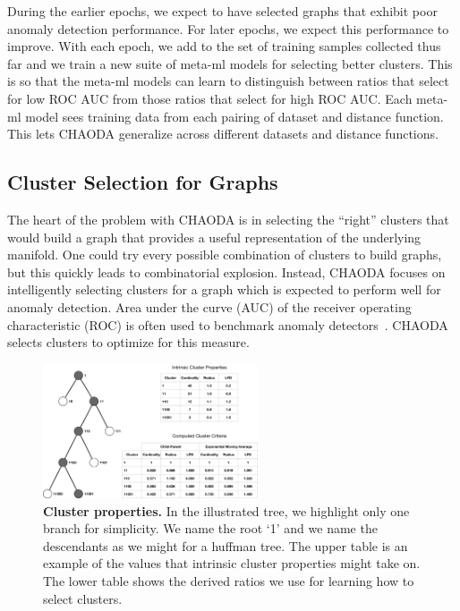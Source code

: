 During the earlier epochs, we expect to have selected graphs that exhibit poor anomaly detection performance.
For later epochs, we expect this performance to improve.
With each epoch, we add to the set of training samples collected thus far and we train a new suite of meta-ml models for selecting better clusters.
This is so that the meta-ml models can learn to distinguish between ratios that select for low ROC AUC from those ratios that select for high ROC AUC.
Each meta-ml model sees training data from each pairing of dataset and distance function.
This lets CHAODA generalize across different datasets and distance functions.


\subsection{Cluster Selection for Graphs}
\label{subsec:methods:cluster-selection-for-graphs}

The heart of the problem with CHAODA is in selecting the ``right'' clusters that would build a graph that provides a useful representation of the underlying manifold.
One could try every possible combination of clusters to build graphs, but this quickly leads to combinatorial explosion.
Instead, CHAODA focuses on intelligently selecting clusters for a graph which is expected to perform well for anomaly detection.
Area under the curve (AUC) of the receiver operating characteristic (ROC) is often used to benchmark anomaly detectors~\cite{fawcett2006introduction}.
CHAODA selects clusters to optimize for this measure.

\begin{figure}[ht!]
    \centering
    \includegraphics[width=2.5in]{images/chaoda-cluster-properties.pdf}
    \caption{
        \textbf{Cluster properties.}
        In the illustrated tree, we highlight only one branch for simplicity.
        We name the root `1' and we name the descendants as we might for a huffman tree.
        The upper table is an example of the values that intrinsic cluster properties might take on.
        The lower table shows the derived ratios we use for learning how to select clusters.
    }
    \label{fig:methods:cluster-properties}
\end{figure}

